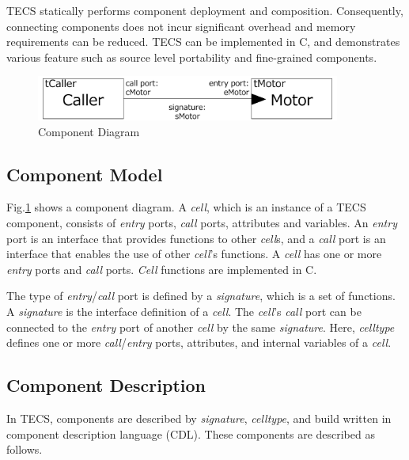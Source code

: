 \documentclass[a4j,12pt,oneside,openany,english]{jsbook}
\begin{document}
TECS statically performs component deployment and composition.
Consequently, connecting components does not incur significant overhead and memory requirements can be reduced.
TECS can be implemented in C, and demonstrates various feature such as source level portability and fine-grained components.

\begin{figure}[t]
    \centering
    \includegraphics[width=10cm,clip]{figure/component_diagram.pdf}
    \caption{Component Diagram}
    \label{fig:component}
\end{figure}

\subsection{Component Model}
Fig.\ref{fig:component} shows a component diagram.
A {\it cell}, which is an instance of a TECS component, consists of {\it entry} ports, {\it call} ports, attributes and variables.
An {\it entry} port is an interface that provides functions to other {\it cell}s, and a {\it call} port is an interface that enables the use of other {\it cell}'s functions.
A {\it cell} has one or more {\it entry} ports and {\it call} ports.
{\it Cell} functions are implemented in C.

The type of {\it entry}/{\it call} port is defined by a {\it signature}, which is a set of functions.
A {\it signature} is the interface definition of a {\it cell}.
The {\it cell}'s  {\it call} port can be connected to the {\it entry} port of another {\it cell} by the same {\it signature}.
Here, {\it celltype} defines one or more {\it call}/{\it entry} ports, attributes, and internal variables of a {\it cell}.


\subsection{Component Description}
In TECS, components are described by {\it signature}, {\it celltype}, and build written in component description language (CDL).
These components are described as follows.
\end{document}
